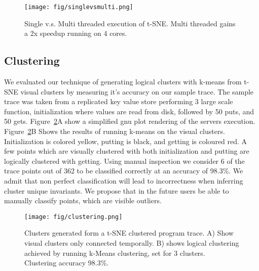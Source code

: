 \begin{figure}[t]
\centering
    \texttt{[image: fig/singlevsmulti.png]}

    \caption{
        Single v.s. Multi threaded execution of t-SNE. Multi threaded gains a 2x speedup running on 4 cores.
    }

    \label{fig:singlevsmulti}
\end{figure}

\subsection{Clustering}

We evaluated our technique of generating logical clusters with k-means
from t-SNE visual clusters by measuring it's accuracy on our sample
trace. The sample trace was taken from a replicated key value store
performing 3 large scale function, initialization where values are read
from disk, followed by 50 puts, and 50 gets.
Figure~\ref{fig:clustering}A show a simplified gnu plot rendering of
the servers execution. Figure~\ref{fig:clustering}B Shows the results
of running k-means on the visual clusters. Initialization is colored
yellow, putting is black, and getting is coloured red. A few points
which are visually clustered with both initialization and putting are
logically clustered with getting. Using manual inspection we consider
6 of the trace points out of 362 to be classified correctly at an
accuracy of 98.3\%. We admit that non perfect classification will lead
to incorrectness when inferring cluster unique invariants. We propose
that in the future users be able to manually classify points, which
are visible outliers.


\begin{figure}[t]
\centering
    \texttt{[image: fig/clustering.png]}

    \caption{
        Clusters generated form a t-SNE clustered program trace. A) Show visual clusters only connected temporally. B) shows logical clustering achieved by running k-Means clustering, set for 3 clusters. Clustering accuracy 98.3\%.
    }

    \label{fig:clustering}
\end{figure}
